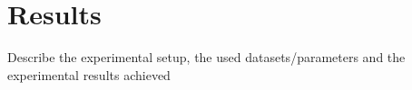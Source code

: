 \section{Results}\label{chap:results}


Describe the experimental setup, the used datasets/parameters and the experimental results achieved
